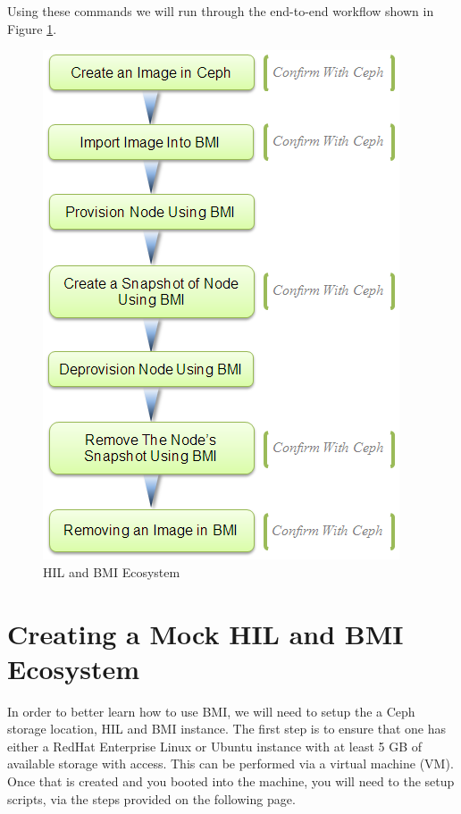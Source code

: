 Using these commands we will run through the end-to-end workflow shown in Figure \ref{fig:bmi-workflow-end-to-end}. 



\begin{figure}[!h] %
\vspace{10mm}
\label{fig:bmi-workflow-end-to-end}
\begin{center}
\includegraphics[scale=1.2]{figures/bmi-workflow-with-image-cleanup-v2.png}
\end{center}
\caption{HIL and BMI Ecosystem}
\end{figure}


\section{Creating a Mock HIL and BMI Ecosystem}


In order to better learn how to use BMI, we will need to setup the a Ceph storage location, HIL and BMI instance.  The first step is to ensure that one has either a RedHat Enterprise Linux or Ubuntu instance with at least 5 GB of available storage with  access.  This can be performed via a virtual machine (VM).  Once that is created and you booted into the machine, you will need to  the setup scripts, via the steps provided on the following page.

